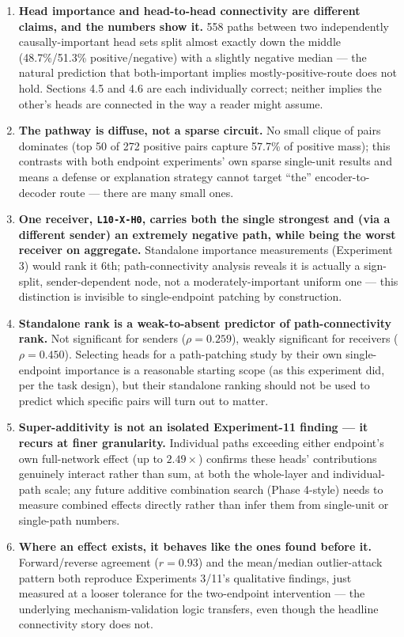 \documentclass[11pt]{article}
\begin{document}
\begin{enumerate}
  \item \textbf{Head importance and head-to-head connectivity are different
  claims, and the numbers show it.} 558 paths between two independently
  causally-important head sets split almost exactly down the middle
  (48.7\%/51.3\% positive/negative) with a slightly negative median — the
  natural prediction that both-important implies mostly-positive-route does
  not hold. Sections 4.5 and 4.6 are each individually correct; neither
  implies the other's heads are connected in the way a reader might assume.
  \item \textbf{The pathway is diffuse, not a sparse circuit.} No small
  clique of pairs dominates (top 50 of 272 positive pairs capture 57.7\% of
  positive mass); this contrasts with both endpoint experiments' own sparse
  single-unit results and means a defense or explanation strategy cannot
  target ``the'' encoder-to-decoder route — there are many small ones.
  \item \textbf{One receiver, \texttt{L10-X-H0}, carries both the single
  strongest and (via a different sender) an extremely negative path, while
  being the worst receiver on aggregate.} Standalone importance measurements
  (Experiment 3) would rank it 6th; path-connectivity analysis reveals it is
  actually a sign-split, sender-dependent node, not a moderately-important
  uniform one — this distinction is invisible to single-endpoint patching by
  construction.
  \item \textbf{Standalone rank is a weak-to-absent predictor of
  path-connectivity rank.} Not significant for senders ($\rho=0.259$),
  weakly significant for receivers ($\rho=0.450$). Selecting heads for a
  path-patching study by their own single-endpoint importance is a reasonable
  starting scope (as this experiment did, per the task design), but their
  standalone ranking should not be used to predict which specific pairs will
  turn out to matter.
  \item \textbf{Super-additivity is not an isolated Experiment-11 finding —
  it recurs at finer granularity.} Individual paths exceeding either
  endpoint's own full-network effect (up to $2.49\times$) confirms these
  heads' contributions genuinely interact rather than sum, at both the
  whole-layer and individual-path scale; any future additive combination
  search (Phase 4-style) needs to measure combined effects directly rather
  than infer them from single-unit or single-path numbers.
  \item \textbf{Where an effect exists, it behaves like the ones found
  before it.} Forward/reverse agreement ($r=0.93$) and the mean/median
  outlier-attack pattern both reproduce Experiments 3/11's qualitative
  findings, just measured at a looser tolerance for the two-endpoint
  intervention — the underlying mechanism-validation logic transfers, even
  though the headline connectivity story does not.
\end{enumerate}
\end{document}
